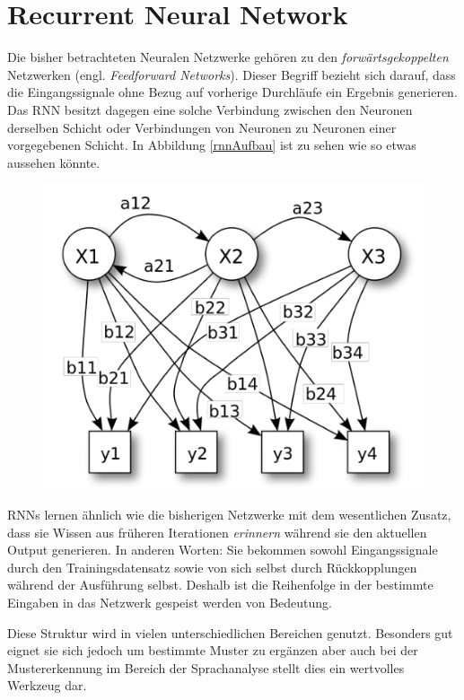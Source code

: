 \section{Recurrent Neural Network}

Die bisher betrachteten Neuralen Netzwerke gehören zu den \emph{forwärtsgekoppelten} Netzwerken (engl. \emph{Feedforward Networks}). Dieser Begriff bezieht sich darauf, dass die Eingangssignale ohne Bezug auf vorherige Durchläufe ein Ergebnis generieren. Das RNN besitzt dagegen eine solche Verbindung zwischen den Neuronen derselben Schicht oder Verbindungen von Neuronen zu Neuronen einer vorgegebenen Schicht. In Abbildung \ref{rnnAufbau} ist zu sehen wie so etwas aussehen könnte. 

\begin{figure}[!htb]
	\centering
	\includegraphics[width=.6\linewidth]{./img/rnn_aufbau}
	\label{fig:rnnAufbau}
\end{figure} 


RNNs lernen ähnlich wie die bisherigen Netzwerke mit dem wesentlichen Zusatz, dass sie Wissen aus früheren Iterationen \emph{erinnern} während sie den aktuellen Output generieren. In anderen Worten: Sie bekommen sowohl Eingangssignale durch den Trainingsdatensatz sowie von sich selbst durch Rückkopplungen während der Ausführung selbst. Deshalb ist die Reihenfolge in der bestimmte Eingaben in das Netzwerk gespeist werden von Bedeutung. 

Diese Struktur wird in vielen unterschiedlichen Bereichen genutzt. Besonders gut eignet sie sich jedoch um bestimmte Muster zu ergänzen aber auch bei der Mustererkennung im Bereich der Sprachanalyse stellt dies ein wertvolles Werkzeug dar. 

